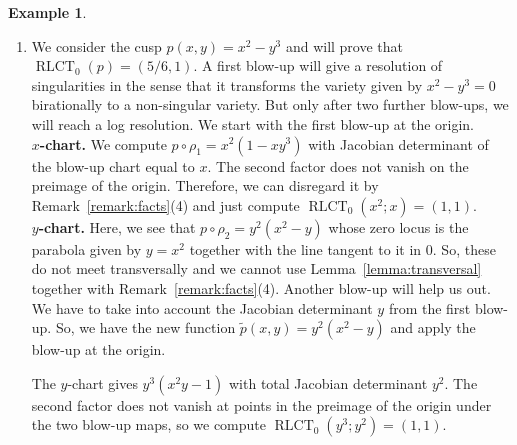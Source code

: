 \documentclass[11pt]{amsart}
\DeclareMathOperator{\rlct}{RLCT}
\numberwithin{equation}{section}
\theoremstyle{plain}
\theoremstyle{definition}
\newtheorem{example}[theorem]{Example}
\newcommand{\R}{\mathbb{R}}
\begin{document}
\begin{example}
\begin{enumerate}
    The first isomorphism $\sigma$ is just the identity. Next, we apply the blow-up of $\R^2$ at the origin. Since $p$ is symmetric in $x$ and $y$, we just have to consider one chart, say $\rho_1(x,y) = (x,xy)$, which gives $p \circ \rho_1 = x^3y(1+y)$ and has Jacobian determinant $x$. A point $(x^*,y^*)$ lies in $\rho_1^{-1}(0)$ if and only if $x^* = 0$. In small neighborhoods of points $(0,y^*)$ with $y^* \notin \{0,-1\}$, the two factors $y$ and $1+y$ do not vanish. Hence, Remark~\ref{remark:facts}(4) gives that the first component of $\rlct_{(0,y^*)}(x^3y(1+y);x)$ is
    $(1+1)/3 = 2/3$.
    This value just appears once as a minimum among the factors, so the second component of the RLCT is $1$. The two points $(0,-1)$ and $(0,0)$ behave the same up to a linear isomorphism. So, we only consider $\rlct_0(x^3y(1+y);x)$ whose first component is computed by
    \[
    \min \left\{ \frac{1+1}{3}, \frac{0+1}{1}  \right\} = \frac{2}{3}.
    \]
    So, minimizing over all points in $\rho_1^{-1}(0)$ by using Remark~\ref{remark:facts}(2), we get \[\rlct_0(xy(x+y))= (2/3,1).\]
    

        
        \item We consider the cusp $p(x,y) = x^2 - y^3$ and will prove that $\rlct_0(p) = (5/6,1)$. A first blow-up will give a resolution of singularities in the sense that it transforms the variety given by $x^2 - y^3 = 0$ birationally to a non-singular variety. But only after two further blow-ups, we will reach a log resolution. We start with the first blow-up at the origin. \\
        \textbf{$x$-chart.} We compute $p \circ \rho_1 = x^2(1 - xy^3)$ with Jacobian determinant of the blow-up chart equal to $x$. The second factor does not vanish on the preimage of the origin. Therefore, we can disregard it by Remark~\ref{remark:facts}(4) and just compute $\rlct_0(x^2;x) = (1,1)$.\\
        \textbf{$y$-chart.} Here, we see that $p \circ \rho_2 = y^2(x^2 - y)$
        whose zero locus is the parabola given by $y = x^2$ together with the line tangent to it in $0$. So, these do not meet transversally and we cannot use Lemma~\ref{lemma:transversal} together with Remark~\ref{remark:facts}(4). Another blow-up will help us out. We have to take into account the Jacobian determinant $y$ from the first blow-up. So, we have the new function $\tilde{p}(x,y) = y^2(x^2 - y)$ and apply the blow-up at the origin. 

    The $y$-chart gives $y^3(x^2y - 1)$ with total Jacobian determinant $y^2$. The second factor does not vanish at points in the preimage of the origin under the two blow-up maps, so we compute $\rlct_0(y^3;y^2) = (1,1)$.


\end{enumerate}
\end{example}
\end{document}
